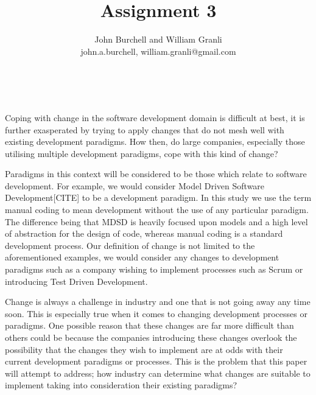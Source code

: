 \documentclass[10pt,twocolumn]{article}
\begin{document}
\overfullrule=2cm


\title{Assignment 3}

\author{John Burchell and William Granli \\
john.a.burchell, william.granli@gmail.com}


\maketitle
\thispagestyle{empty}




​

Coping with change in the software development domain is difficult at best, it is further exasperated by trying to apply changes that do not mesh well with existing development paradigms. How then, do large companies, especially those utilising multiple development paradigms, cope with this kind of change?

Paradigms in this context will be considered to be those which relate to software development. For example, we would consider Model Driven Software Development[CITE] to be a development paradigm. In this study we use the term manual coding to mean development without the use of any particular paradigm. The difference being that MDSD is heavily focused upon models and a high level of abstraction for the design of code, whereas manual coding is a standard development process. Our definition of change is not limited to the aforementioned examples, we would consider any changes to development paradigms such as a company wishing to implement processes such as Scrum or introducing Test Driven Development.

Change is always a challenge in industry and one that is not going away any time soon. This is especially true when it comes to changing development processes or paradigms. One possible reason that these changes are far more difficult than others could be because the companies introducing these changes overlook the possibility that the changes they wish to implement are at odds with their current development paradigms or processes. This is the problem that this paper will attempt to address; how industry can determine what changes are suitable to implement taking into consideration their existing paradigms?
\end{document}
